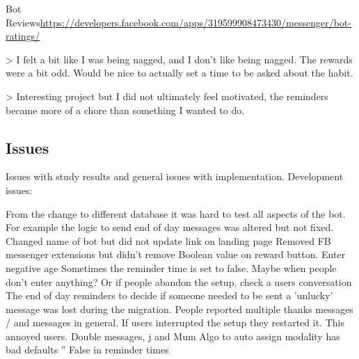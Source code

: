 Bot Reviews\url{https://developers.facebook.com/apps/319599908473430/messenger/bot-ratings/}


> I felt a bit like I was being nagged, and I don't like being nagged. The rewards were a bit odd. Would be nice to actually set a time to be asked about the habit.

> Interesting project but I did not ultimately feel motivated, the reminders became more of a chore than something I wanted to do.

\subsection*{Issues}
Issues with study results and general issues with implementation.
Development issues:

From the change to different database it was hard to test all aspects of the bot. For example the logic to send end of day messages was altered but not fixed.
Changed name of bot but did not update link on landing page
Removed FB messenger extensions but didn't remove Boolean value on reward button.
Enter negative age
Sometimes the reminder time is set to false. Maybe when people don't enter anything? Or if people abandon the setup, check a users conversation
The end of day reminders to decide if someone needed to be sent a 'unlucky' message was lost during the migration.
People reported multiple thanks messages / and messages in general.
If users interrupted the setup they restarted it. This annoyed users.
Double messages, j and Mum
Algo to auto assign modality has bad defaults ''
False in reminder times

